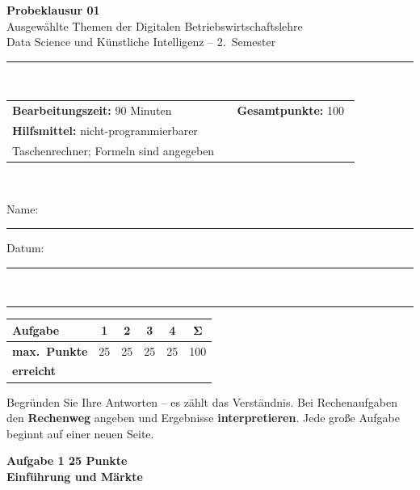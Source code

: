 \documentclass[a4paper,11pt]{article}
\newcommand{\hauptaufgabe}[3]{\clearpage%
  \noindent\colorbox{accent}{\parbox{\dimexpr\linewidth-2\fboxsep\relax}{%
    \color{bgdark}\large\bfseries Aufgabe #1 \hfill #2 Punkte\\[1pt]
    \normalsize #3}}\par\vspace{3mm}}
\begin{document}
\thispagestyle{fancy}
\begin{center}
  {\color{accent}\LARGE\bfseries Probeklausur 01}\\[3pt]
  {\large Ausgewählte Themen der Digitalen Betriebswirtschaftslehre}\\[2pt]
  {\small Data Science und Künstliche Intelligenz -- 2.\ Semester}
\end{center}

\vspace{4mm}
\noindent\textcolor{gridcol}{\rule{\linewidth}{0.4pt}}\\[2mm]
\begin{tabular}{@{}p{0.62\linewidth}p{0.34\linewidth}@{}}
\textbf{Bearbeitungszeit:} 90 Minuten & \textbf{Gesamtpunkte:} 100 \\[2mm]
\textbf{Hilfsmittel:} nicht-programmierbarer & \\
Taschenrechner; Formeln sind angegeben & \\
\end{tabular}\\[2mm]
{\large Name:\enspace\textcolor{gridcol}{\rule{5.5cm}{0.4pt}}\hfill Datum:\enspace\textcolor{gridcol}{\rule{3.5cm}{0.4pt}}}\\[2mm]
\noindent\textcolor{gridcol}{\rule{\linewidth}{0.4pt}}

\vspace{4mm}
\begin{center}
\renewcommand{\arraystretch}{1.5}
\begin{tabular}{|l|c|c|c|c|c|}
\hline
\textbf{Aufgabe} & 1 & 2 & 3 & 4 & $\boldsymbol{\Sigma}$\\\hline
\textbf{max.\ Punkte} & 25 & 25 & 25 & 25 & 100\\\hline
\textbf{erreicht} & & & & & \\\hline
\end{tabular}
\end{center}

\vspace{3mm}
 Begründen Sie Ihre Antworten -- es zählt das
Verständnis. Bei Rechenaufgaben den \textbf{Rechenweg} angeben und Ergebnisse
\textbf{interpretieren}. Jede große Aufgabe beginnt auf einer neuen Seite.

\hauptaufgabe{1}{25}{Einführung und Märkte}
\end{document}

